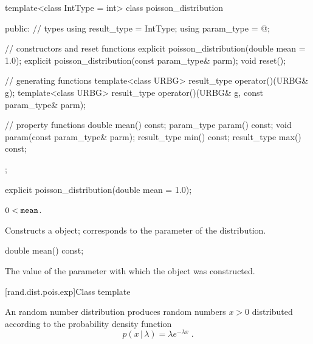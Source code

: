 %
\begin{codeblock}
template<class IntType = int>
  class poisson_distribution
  {
  public:
    // types
    using result_type = IntType;
    using param_type  = @\unspec@;

    // constructors and reset functions
    explicit poisson_distribution(double mean = 1.0);
    explicit poisson_distribution(const param_type& parm);
    void reset();

    // generating functions
    template<class URBG>
      result_type operator()(URBG& g);
    template<class URBG>
      result_type operator()(URBG& g, const param_type& parm);

    // property functions
    double mean() const;
    param_type param() const;
    void param(const param_type& parm);
    result_type min() const;
    result_type max() const;
  };
\end{codeblock}

%
\begin{itemdecl}
explicit poisson_distribution(double mean = 1.0);
\end{itemdecl}

\begin{itemdescr}
\pnum\requires
 $ 0 < \texttt{mean} $.

\pnum\effects Constructs a  object;
 corresponds to the parameter of the distribution.
\end{itemdescr}

%
\begin{itemdecl}
double mean() const;
\end{itemdecl}

\begin{itemdescr}
\pnum\returns The value of the  parameter
 with which the object was constructed.
\end{itemdescr}


[rand.dist.pois.exp]{Class template }%
%
%

\pnum
An  random number distribution
produces random numbers $x > 0$
distributed according to
the probability density function%
%
%
\[%
 p(x\,|\,\lambda)
      = \lambda e^{-\lambda x}
\; \mbox{.}
\]

